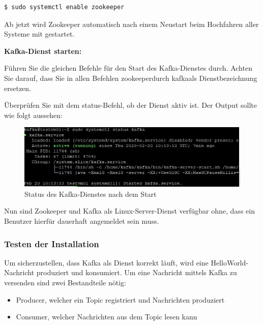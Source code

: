 \documentclass[a4paper,titlepage,halfparskip,12pt]{scrreprt}
\begin{document}
\begin{onehalfspacing}
\smallskip

\begin{lstlisting}[language=Bash]
$ sudo systemctl enable zookeeper
\end{lstlisting}

Ab jetzt wird Zookeeper automatisch nach einem Neustart beim Hochfahren aller Systeme mit gestartet.

\textbf{Kafka-Dienst starten:}

\bigskip

Führen Sie die gleichen Befehle für den Start des Kafka-Dienstes durch. Achten Sie darauf, dass Sie in allen Befehlen \glqq zookeeper\grqq durch \glqq kafka\grqq als Dienstbezeichnung ersetzen.

\smallskip

Überprüfen Sie mit dem \glqq status\grqq -Befehl, ob der Dienst aktiv ist. Der Output sollte wie folgt aussehen:

\begin{figure}[h]
	\centering
	\includegraphics{images/StatusKafka}
	\caption{Status des Kafka-Dienstes nach dem Start}
	\label{img:StatusZookeeper}
\end{figure}

Nun sind Zookeeper und Kafka als Linux-Server-Dienst verfügbar ohne, dass ein Benutzer hierfür dauerhaft angemeldet sein muss.

\subsubsection*{Testen der Installation}

Um sicherzustellen, dass Kafka als Dienst korrekt läuft, wird eine \glqq HelloWorld\grqq -Nachricht produziert und konsumiert. Um eine Nachricht mittels Kafka zu versenden sind zwei Bestandteile nötig:

\begin{itemize}
\item Producer, welcher ein Topic registriert und Nachrichten produziert
\item Consumer, welcher Nachrichten aus dem Topic lesen kann
\end{itemize}


\end{onehalfspacing}
\end{document}
